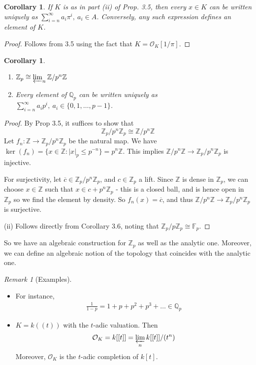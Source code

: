 \documentclass[]{article}
\theoremstyle{custhm}
\theoremstyle{cusdef}
\theoremstyle{custhm}
\theoremstyle{custhm}
\newtheorem{cor}[theorem]{Corollary}
\theoremstyle{custhm}
\theoremstyle{custhm}
\theoremstyle{cusdef}
\theoremstyle{remark}
\newtheorem*{remark*}{Remark}
\newcommand{\Z}{\mathbb{Z}}
\newcommand{\Q}{\mathbb{Q}}
\newcommand{\ra}{\rightarrow}
\renewcommand{\bar}{\overline}
\renewcommand{\O}{\mathcal{O}}
\begin{document}
\begin{cor}
If $K$ is as in part (ii) of Prop. 3.5, then every $x\in K$ can be written uniquely as $\sum_{i=n}^{\infty}a_i\pi^i,\ a_i\in A$. Conversely, any such expression defines an element of $K$.
\end{cor}
\begin{proof}
Follows from 3.5 using the fact that $K = \O_K[1/\pi]$.
\end{proof}
\begin{cor}
\begin{enumerate}[label=(\roman*)]
	\item $\Z_p\cong\varprojlim_n\Z/p^n\Z$
	\item Every element of $\Q_p$ can be written uniquely as $\sum_{i=n}^{\infty}a_ip^i,\ a_i\in \{0,1,\dots,p-1\}$.
\end{enumerate}
\end{cor}
\begin{proof}
By Prop 3.5, it suffices to show that
\[
\Z_p/p^n\Z_p \cong \Z/p^n\Z
\]
Let $f_n:\Z\ra\Z_p/p^n\Z_p$ be the natural map. We have $\ker (f_n) = \{x\in \Z : |x|_p \le p^{-n}\} = p^n\Z$. This implies $\Z/p^n\Z \ra \Z_p/p^n\Z_p$ is injective.

For surjectivity, let $\bar{c}\in \Z_p/p^n\Z_p$, and $c\in \Z_p$ a lift. Since $\Z$ is dense in $\Z_p$, we can choose $x\in\Z$ such that $x\in c + p^n\Z_p$ - this is a closed ball, and is hence open in $\Z_p$ so we find the element by density. So $f_n(x) = \bar{c}$, and thus $\Z/p^n\Z\ra\Z_p/p^n\Z_p$ is surjective.

(ii) Follows directly from Corollary 3.6, noting that $\Z_p/p\Z_p\cong \mathbb{F}_p$.
\end{proof}

So we have an algebraic construction for $\Z_p$ as well as the analytic one. Moreover, we can define an algebraic notion of the topology that coincides with the analytic one.

\begin{remark*}[Examples]\ 
\begin{itemize}
\item For instance,
\begin{align*}
\frac{1}{1-p} = 1 + p + p^2 +p^3+\dots \in \Q_p
\end{align*}
\item $K = k((t))$ with the $t$-adic valuation. Then
\begin{align*}
\O_K = k[[t]] = \varprojlim_n k[[t]]/(t^n)
\end{align*}
Moreover, $\O_K$ is the $t$-adic completion of $k[t]$.
\end{itemize}
\end{remark*}
\end{document}
